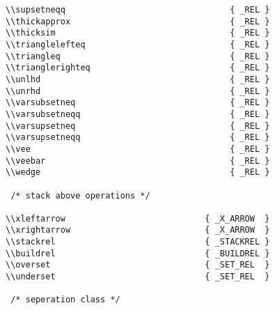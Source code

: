 \begin{verbatim}
\\supsetneqq                                 { _REL }
\\thickapprox                                { _REL }
\\thicksim                                   { _REL }
\\trianglelefteq                             { _REL }
\\triangleq                                  { _REL }
\\trianglerighteq                            { _REL }
\\unlhd                                      { _REL }
\\unrhd                                      { _REL }
\\varsubsetneq                               { _REL }
\\varsubsetneqq                              { _REL }
\\varsupsetneq                               { _REL }
\\varsupsetneqq                              { _REL }
\\vee                                        { _REL } 
\\veebar                                     { _REL } 
\\wedge                                      { _REL } 
 
 /* stack above operations */

\\xleftarrow                            { _X_ARROW  }
\\xrightarrow                           { _X_ARROW  }
\\stackrel                              { _STACKREL }
\\buildrel                              { _BUILDREL }
\\overset                               { _SET_REL  }
\\underset                              { _SET_REL  }

 /* seperation class */


\end{verbatim}
